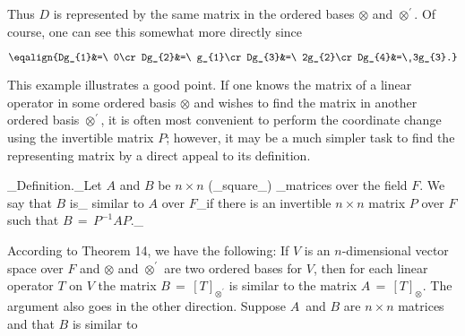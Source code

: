 Thus \(D\) is represented by the same matrix in the ordered bases \(\otimes\) and \(\otimes^{\prime}\). Of course, one can see this somewhat more directly since

\[\eqalign{Dg_{1}&=\ 0\cr Dg_{2}&=\ g_{1}\cr Dg_{3}&=\ 2g_{2}\cr Dg_{4}&=\ 3g_{3}.}\]

This example illustrates a good point. If one knows the matrix of a linear operator in some ordered basis \(\otimes\) and wishes to find the matrix in another ordered basis \(\otimes^{\prime}\), it is often most convenient to perform the coordinate change using the invertible matrix \(P\); however, it may be a much simpler task to find the representing matrix by a direct appeal to its definition.

_Definition._Let \(A\) and \(B\) be \(n\times n\) (_square_) _matrices over the field \(F\). We say that \(B\) is_ similar to \(A\) over \(F\)_if there is an invertible \(n\times n\) matrix \(P\) over \(F\) such that \(B\,=\,P^{-1}AP\)._

According to Theorem 14, we have the following: If \(V\) is an \(n\)-dimensional vector space over \(F\) and \(\otimes\) and \(\otimes^{\prime}\) are two ordered bases for \(V\), then for each linear operator \(T\) on \(V\) the matrix \(B\,=\,[T]_{\otimes^{\prime}}\) is similar to the matrix \(A\,=\,[T]_{\otimes}\). The argument also goes in the other direction. Suppose \(A\,\) and \(B\) are \(n\times n\) matrices and that \(B\) is similar to 